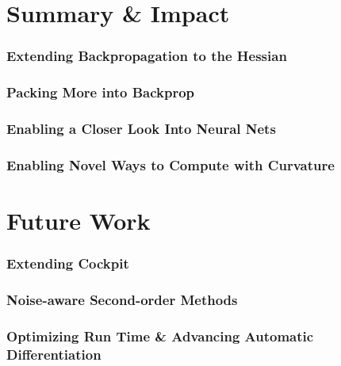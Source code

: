 \Blindtext

\section{Summary \& Impact}

\subsubsection{Extending Backpropagation to the Hessian}
\blindtext

\subsubsection{Packing More into Backprop}
\blindtext

\subsubsection{Enabling a Closer Look Into Neural Nets}
\blindtext

\subsubsection{Enabling Novel Ways to Compute with Curvature}
\blindtext

\section{Future Work}
\blindtext

\subsubsection{Extending Cockpit}
\blindtext

\subsubsection{Noise-aware Second-order Methods}
\blindtext

\subsubsection{Optimizing Run Time \& Advancing Automatic Differentiation}
\blindtext

